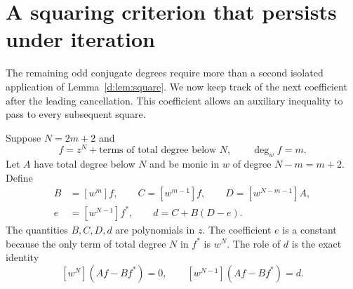 \documentclass[UTF8,11pt]{ctexart}
\theoremstyle{definition}
\numberwithin{equation}{section}
\begin{document}
\section{A squaring criterion that persists under iteration}\label{d:sec:iteration}

The remaining odd conjugate degrees require more than a second isolated
application of Lemma~\ref{d:lem:square}. We now keep track of the next
coefficient after the leading cancellation. This coefficient allows an
auxiliary inequality to pass to every subsequent square.

Suppose $N=2m+2$ and
\[
 f=z^N+\text{terms of total degree below }N,\qquad \deg_w f=m.
\]
Let $A$ have total degree below $N$ and be monic in $w$ of degree
$N-m=m+2$. Define
\begin{equation}\label{d:eq:nextcoefficient}
 \begin{split}
 B&=[w^m]f,\qquad C=[w^{m-1}]f,\qquad D=[w^{N-m-1}]A,\\
 e&=[w^{N-1}]f^*,\qquad d=C+B(D-e).
 \end{split}
\end{equation}
The quantities $B,C,D,d$ are polynomials in $z$. The coefficient $e$ is
a constant because the only term of total degree $N$ in $f^*$ is $w^N$.
The role of $d$ is the exact identity
\begin{equation}\label{d:eq:coefficientidentity}
 [w^N](Af-Bf^*)=0,\qquad [w^{N-1}](Af-Bf^*)=d.
\end{equation}
\end{document}
